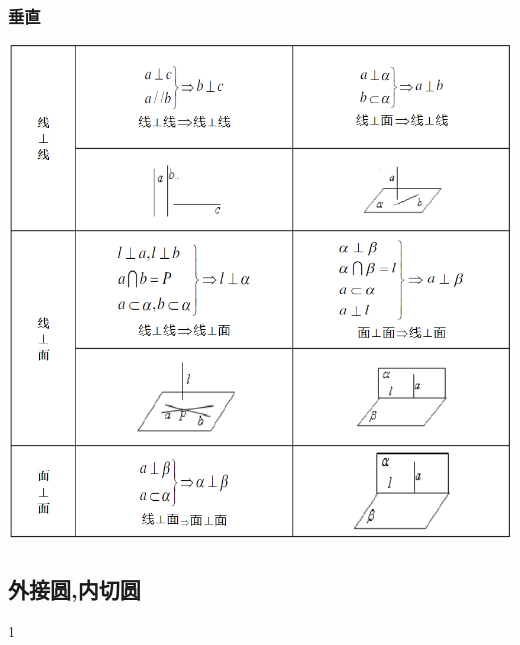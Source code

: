 \documentclass[hyperref, UTF8,11pt,a4paper]{ctexart} %
\begin{document}
\subsubsection{垂直}
\begin{center}
	\includegraphics[width=420pt]  {pic/litijihe/czzm.png} \\
\end{center}



\subsection{外接圆,内切圆}
1
\end{document}
